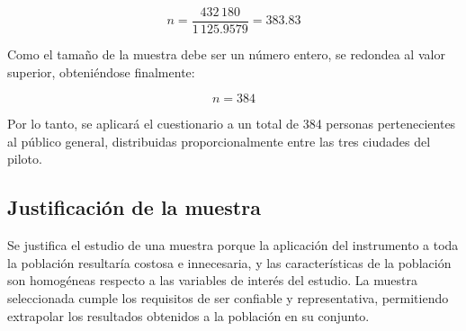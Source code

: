 \begin{equation}
n = \frac{432\,180}{1\,125.9579} = 383.83
\label{eq:muestra-operada3}
\end{equation}

Como el tama\~no de la muestra debe ser un n\'umero entero, se redondea al
valor superior, obteni\'endose finalmente:

\begin{equation}
n = 384
\label{eq:muestra-final}
\end{equation}

Por lo tanto, se aplicar\'a el cuestionario a un total de 384
personas pertenecientes al p\'ublico general, distribuidas
proporcionalmente entre las tres ciudades del piloto.

\subsection{Justificaci\'on de la muestra}

Se justifica el estudio de una muestra porque la aplicaci\'on del instrumento a
toda la poblaci\'on resultar\'ia costosa e innecesaria, y las caracter\'isticas de
la poblaci\'on son homog\'eneas respecto a las variables de inter\'es del estudio.
La muestra seleccionada cumple los requisitos de ser confiable y
representativa, permitiendo extrapolar los resultados obtenidos a la
poblaci\'on en su conjunto.
